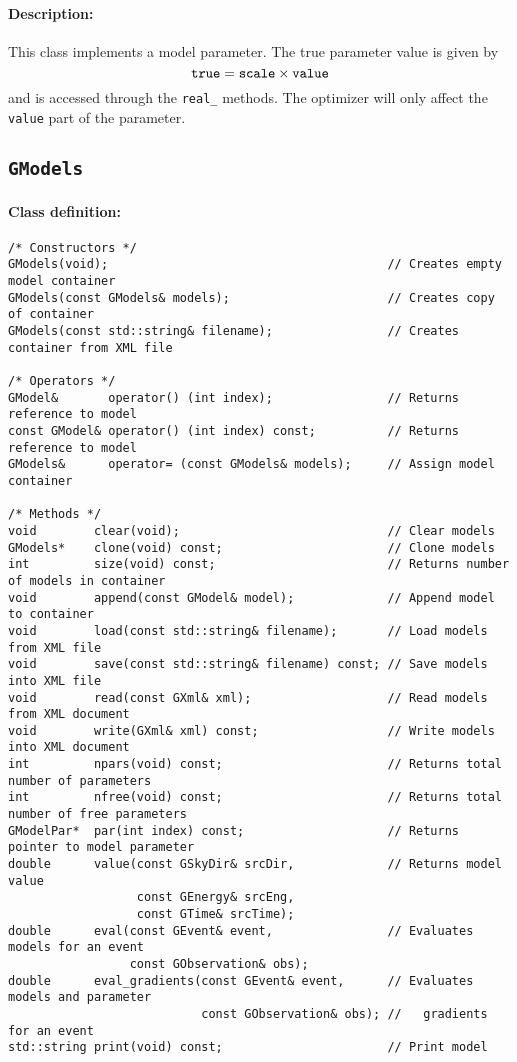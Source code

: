 \documentclass{article}[12pt,a4]
\begin{document}
\paragraph{Description:}
This class implements a model parameter.
The true parameter value is given by
\begin{equation}
{\tt true} = {\tt scale} \times {\tt value}
\end{equation}
and is accessed through the {\tt real\_} methods.
The optimizer will only affect the {\tt value} part of the parameter.


\newpage
\subsection{{\tt GModels}}

\paragraph{Class definition:}
\begin{verbatim}
/* Constructors */
GModels(void);                                       // Creates empty model container
GModels(const GModels& models);                      // Creates copy of container
GModels(const std::string& filename);                // Creates container from XML file

/* Operators */
GModel&       operator() (int index);                // Returns reference to model
const GModel& operator() (int index) const;          // Returns reference to model
GModels&      operator= (const GModels& models);     // Assign model container

/* Methods */
void        clear(void);                             // Clear models
GModels*    clone(void) const;                       // Clone models
int         size(void) const;                        // Returns number of models in container
void        append(const GModel& model);             // Append model to container
void        load(const std::string& filename);       // Load models from XML file
void        save(const std::string& filename) const; // Save models into XML file
void        read(const GXml& xml);                   // Read models from XML document
void        write(GXml& xml) const;                  // Write models into XML document
int         npars(void) const;                       // Returns total number of parameters
int         nfree(void) const;                       // Returns total number of free parameters
GModelPar*  par(int index) const;                    // Returns pointer to model parameter
double      value(const GSkyDir& srcDir,             // Returns model value
                  const GEnergy& srcEng,
                  const GTime& srcTime);
double      eval(const GEvent& event,                // Evaluates models for an event
                 const GObservation& obs);
double      eval_gradients(const GEvent& event,      // Evaluates models and parameter
                           const GObservation& obs); //   gradients for an event
std::string print(void) const;                       // Print model
\end{verbatim}
\end{document}
